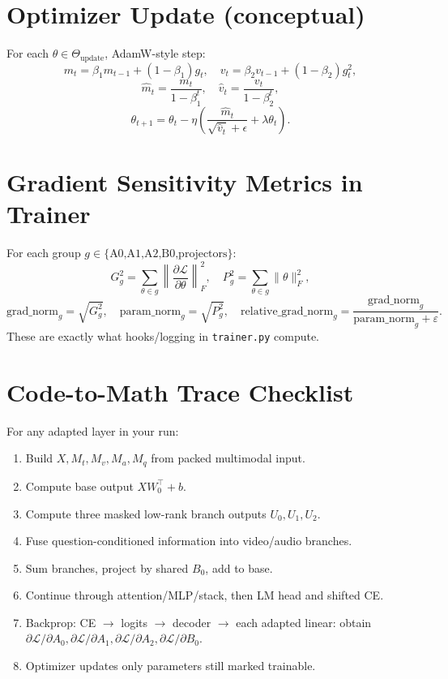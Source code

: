 \documentclass[11pt]{article}
\begin{document}
\section{Optimizer Update (conceptual)}
For each $\theta\in\Theta_{\text{update}}$, AdamW-style step:
\[
m_t=\beta_1m_{t-1}+(1-\beta_1)g_t,\quad
v_t=\beta_2v_{t-1}+(1-\beta_2)g_t^2,
\]
\[
\hat m_t=\frac{m_t}{1-\beta_1^t},\quad
\hat v_t=\frac{v_t}{1-\beta_2^t},
\]
\[
\theta_{t+1}=\theta_t-\eta\left(\frac{\hat m_t}{\sqrt{\hat v_t}+\epsilon}+\lambda\theta_t\right).
\]

\section{Gradient Sensitivity Metrics in Trainer}
For each group $g\in\{\text{A0,A1,A2,B0,projectors}\}$:
\[
G_g^2 = \sum_{\theta\in g}\left\|\frac{\partial\mathcal L}{\partial\theta}\right\|_F^2,\quad
P_g^2 = \sum_{\theta\in g}\|\theta\|_F^2,
\]
\[
\text{grad\_norm}_g=\sqrt{G_g^2},\quad
\text{param\_norm}_g=\sqrt{P_g^2},\quad
\text{relative\_grad\_norm}_g=\frac{\text{grad\_norm}_g}{\text{param\_norm}_g+\varepsilon}.
\]
These are exactly what hooks/logging in \texttt{trainer.py} compute.

\section{Code-to-Math Trace Checklist}
For any adapted layer in your run:
\begin{enumerate}
\item Build $X,M_t,M_v,M_a,M_q$ from packed multimodal input.
\item Compute base output $XW_0^\top+b$.
\item Compute three masked low-rank branch outputs $U_0,U_1,U_2$.
\item Fuse question-conditioned information into video/audio branches.
\item Sum branches, project by shared $B_0$, add to base.
\item Continue through attention/MLP/stack, then LM head and shifted CE.
\item Backprop: CE $\rightarrow$ logits $\rightarrow$ decoder $\rightarrow$ each adapted linear:
      obtain $\partial\mathcal L/\partial A_0,\partial\mathcal L/\partial A_1,\partial\mathcal L/\partial A_2,\partial\mathcal L/\partial B_0$.
\item Optimizer updates only parameters still marked trainable.
\end{enumerate}
\end{document}
